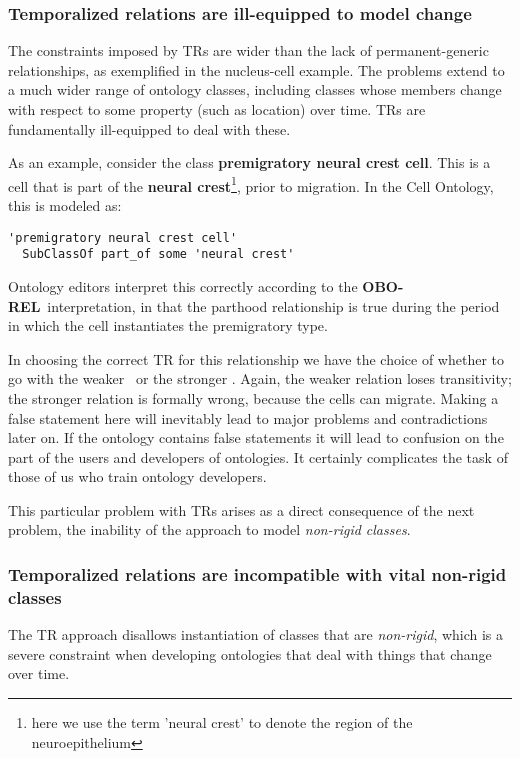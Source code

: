 \documentclass{bioinfo}
\def\atAllTimes{\pr{at-all-times}}
\def\atSomeTimes{\pr{at-some-times}}
\def\OBOREL{\textbf{OBO-REL}}
\begin{document}
\subsubsection{Temporalized relations are ill-equipped to model change}

The constraints imposed by TRs are wider than the lack of
permanent-generic relationships, as exemplified in the nucleus-cell
example. The problems extend to a much wider range of ontology
classes, including classes whose members change with respect to some
property (such as location) over time. TRs are fundamentally
ill-equipped to deal with these.

As an example, consider the class \textbf{premigratory neural crest
  cell}. This is a cell that is part of the \textbf{neural
  crest}\footnote{here we use the term 'neural crest' to denote the
  region of the neuroepithelium}, prior to migration. In the Cell
Ontology, this is modeled as:

\begin{verbatim}
'premigratory neural crest cell' 
  SubClassOf part_of some 'neural crest'
\end{verbatim}

Ontology editors interpret this correctly according to the \OBOREL\
interpretation, in that the parthood relationship is true during the
period in which the cell instantiates the premigratory type.

In choosing the correct TR for this relationship we have the choice of
whether to go with the weaker \atSomeTimes\ or the stronger
\atAllTimes. Again, the weaker relation loses transitivity; the
stronger relation is formally wrong, because the cells can
migrate. Making a false statement here will inevitably lead to major
problems and contradictions later on. If the ontology contains false
statements it will lead to confusion on the part of the users and
developers of ontologies. It certainly complicates the task of those
of us who train ontology developers.

This particular problem with TRs arises as a direct consequence of the
next problem, the inability of the approach to model \emph{non-rigid
  classes}.

\subsubsection{Temporalized relations are incompatible with vital
  non-rigid classes}

The TR approach disallows instantiation of classes that are
\emph{non-rigid}, which is a severe constraint when developing
ontologies that deal with things that change over time.
\end{document}
